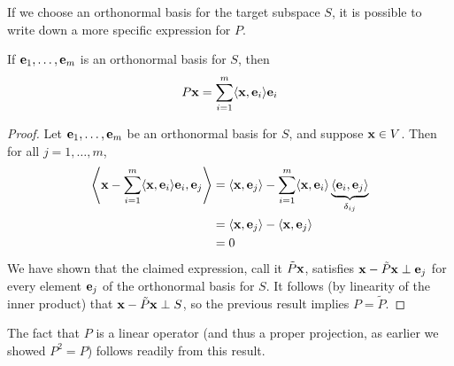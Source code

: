 If we choose an orthonormal basis for the target subspace $S$, it is possible to write down a more specific expression for $P$.
\begin{proposition}
If $\mathbf{e}_1, \dots, \mathbf{e}_m$ is an orthonormal basis for $S$, then
\[P\mathbf{x} = \sum_{i=1}^m \langle \mathbf{x}, \mathbf{e}_i \rangle\mathbf{e}_i\]
\end{proposition}
\begin{proof}	
Let $\mathbf{e}_1, \dots, \mathbf{e}_m$ be an orthonormal basis for $S$, and suppose $\mathbf{x} \in V$.
Then for all $j = 1, \dots, m$,
\begin{align*}
\left\langle \mathbf{x}-\sum_{i=1}^m \langle \mathbf{x}, \mathbf{e}_i \rangle\mathbf{e}_i, \mathbf{e}_j \right\rangle &= \langle \mathbf{x}, \mathbf{e}_j \rangle - \sum_{i=1}^m \langle \mathbf{x}, \mathbf{e}_i \rangle\underbrace{\langle \mathbf{e}_i, \mathbf{e}_j \rangle}_{\delta_{ij}} \\
&= \langle \mathbf{x}, \mathbf{e}_j \rangle - \langle \mathbf{x}, \mathbf{e}_j \rangle \\
&= 0
\end{align*}
We have shown that the claimed expression, call it $\tilde{P}\mathbf{x}$, satisfies $\mathbf{x} - \tilde{P}\mathbf{x} \perp \mathbf{e}_j$ for every element $\mathbf{e}_j$ of the orthonormal basis for $S$.
It follows (by linearity of the inner product) that $\mathbf{x} - \tilde{P}\mathbf{x} \perp S$, so the previous result implies $P = \tilde{P}$.
\end{proof}
The fact that $P$ is a linear operator (and thus a proper projection, as earlier we showed $P^2 = P$) follows readily from this result.

%

